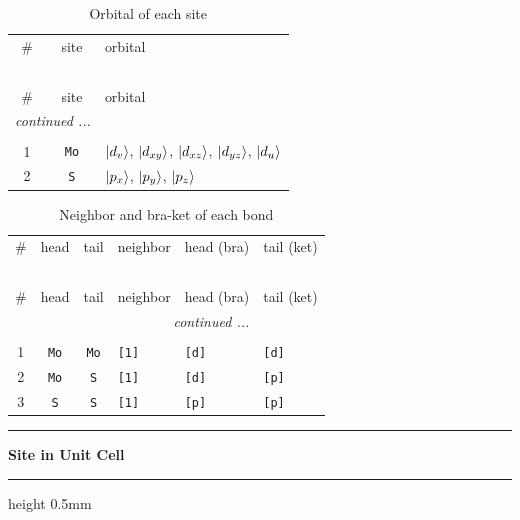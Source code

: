 \documentclass[fleqn,10pt,landscape]{jsarticle}
\begin{document}
\renewcommand{\arraystretch}{1.6}
\begin{longtable}[l]{ccl}
\captionsetup{justification=raggedright, singlelinecheck=off}
\caption{Orbital of each site}
 \\
 \hline \hline
\# & site & orbital \\ \hline \endfirsthead

\multicolumn{2}{l}{\tablename\ \thetable{}} \\
 \hline \hline
\# & site & orbital \\ \hline \endhead

 \hline \hline
\multicolumn{2}{r}{\footnotesize\it continued ...} \\ \endfoot

 \hline \hline
\multicolumn{2}{r}{} \\ \endlastfoot

1 & \texttt{Mo} & $\ket{d_{v}}$, $\ket{d_{xy}}$, $\ket{d_{xz}}$, $\ket{d_{yz}}$, $\ket{d_{u}}$ \\ \hline
2 & \texttt{S} & $\ket{p_{x}}$, $\ket{p_{y}}$, $\ket{p_{z}}$ \\
\end{longtable}
\renewcommand{\arraystretch}{1.6}
\begin{longtable}[l]{ccclll}
\captionsetup{justification=raggedright, singlelinecheck=off}
\caption{Neighbor and bra-ket of each bond}
 \\
 \hline \hline
\# & head & tail & neighbor & head (bra) & tail (ket) \\ \hline \endfirsthead

\multicolumn{5}{l}{\tablename\ \thetable{}} \\
 \hline \hline
\# & head & tail & neighbor & head (bra) & tail (ket) \\ \hline \endhead

 \hline \hline
\multicolumn{5}{r}{\footnotesize\it continued ...} \\ \endfoot

 \hline \hline
\multicolumn{5}{r}{} \\ \endlastfoot

1 & \texttt{Mo} & \texttt{Mo} & \texttt{[1]} & \texttt{[d]} & \texttt{[d]} \\ \hline
2 & \texttt{Mo} & \texttt{S} & \texttt{[1]} & \texttt{[d]} & \texttt{[p]} \\ \hline
3 & \texttt{S} & \texttt{S} & \texttt{[1]} & \texttt{[p]} & \texttt{[p]} \\
\end{longtable}
\vspace{5mm}
\noindent \rule[0.5mm]{5mm}{0.5mm}\hspace{3mm}\textbf{Site in Unit Cell}\hspace{3mm}\leaders\hrule height 0.5mm\hfill\kern0pt
\vspace{3mm}
\end{document}
